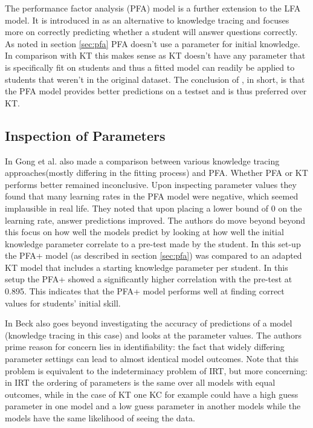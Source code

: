 \documentclass{scrartcl}
\begin{document}
The performance factor analysis (PFA) model is a further extension to the LFA model. It is introduced in \cite{pfa} as an alternative to knowledge tracing and focuses more on correctly predicting whether a student will answer questions correctly. As noted in section \ref{sec:pfa} PFA doesn't use a parameter for initial knowledge. In comparison with KT this makes sense as KT doesn't have any parameter that is specifically fit on students and thus a fitted model can readily be applied to students that weren't in the original dataset. The conclusion of \cite{pfa}, in short, is that the PFA model provides better predictions on a testset and is thus preferred over KT.



\subsection{Inspection of Parameters}
In \cite{ktpfa} Gong et al. also made a comparison between various knowledge tracing approaches(mostly differing in the fitting process) and PFA. Whether PFA or KT performs better remained inconclusive. Upon inspecting parameter values they found that many learning rates in the PFA model were negative, which seemed implausible in real life. They noted that upon placing a lower bound of 0 on the learning rate, answer predictions improved. The authors do move beyond beyond this focus on how well the models predict by looking at how well the initial knowledge parameter correlate to a pre-test made by the student. In this set-up the PFA+ model (as described in section \ref{sec:pfa}) was compared to an adapted KT model that includes a starting knowledge parameter per student. In this setup the PFA+ showed a significantly higher correlation with the pre-test at 0.895. This indicates that the PFA+ model performs well at finding correct values for students' initial skill.

In \cite{knowledgeproblem} Beck also goes beyond investigating the accuracy of predictions of a model (knowledge tracing in this case) and looks at the parameter values. The authors prime reason for concern lies in identifiability: the fact that widely differing parameter settings can lead to almost identical model outcomes. Note that this problem is equivalent to the indeterminacy problem of IRT, but more concerning: in IRT the ordering of parameters is the same over all models with equal outcomes, while in the case of KT one KC for example could have a high guess parameter in one model and a low guess parameter in another models while the models have the same likelihood of seeing the data. 
\end{document}
